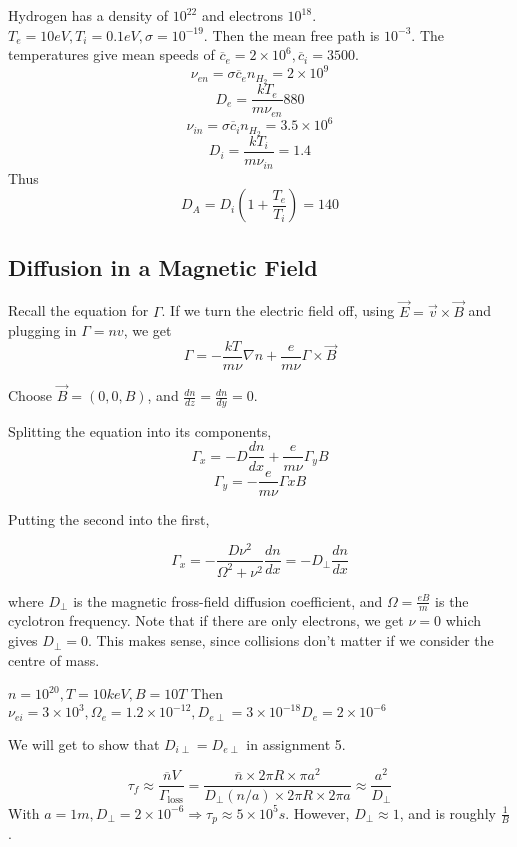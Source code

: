 \documentclass[12pt]{article}
\begin{document}
\begin{ex}
    Hydrogen has a density of $10^{22}$ and electrons $10^{18}$. $T_e = 10\unit{eV}, T_i = 0.1\unit{eV}, \sigma = 10^{-19}$. Then the mean free path is $10^{-3}$. The temperatures give mean speeds of $\overline c_e = 2 \times 10^6, \overline c_i = 3500$.
    $$\nu_{en} = \sigma\overline c_e n_{H_2} = 2 \times 10^9$$
    $$D_e = \frac{kT_e}{m\nu_{en}} 880$$
    $$\nu_{in} = \sigma \overline c_i n_{H_2} = 3.5 \times 10^6$$
    $$D_i = \frac{kT_i}{m\nu_{in}} = 1.4$$
    Thus
    $$D_A =  D_i\left(1 + \frac{T_e}{T_i}\right) = 140$$
\end{ex}

\subsection{Diffusion in a Magnetic Field}

Recall the equation for $\Gamma$. If we turn the electric field off, using $\vec E = \vec v \times \vec B$ and plugging in $\Gamma = nv$, we get
$$\Gamma = -\frac{kT}{m\nu} \nabla n + \frac{e}{m\nu} \Gamma \times \vec B$$

Choose $\vec B = (0,0,B)$, and $\frac{dn}{dz} = \frac{dn}{dy} = 0$.

Splitting the equation into its components,
$$\Gamma_x = -D \frac{dn}{dx} + \frac{e}{m\nu} \Gamma_yB$$
$$\Gamma_y = -\frac{e}{m\nu}\Gamma xB$$

Putting the second into the first,

$$\Gamma_x = -\frac{D\nu^2}{\Omega^2 + \nu^2} \frac{dn}{dx} = -D_\perp \frac{dn}{dx}$$

where $D_\perp$ is the magnetic fross-field diffusion coefficient, and $\Omega = \frac{eB}{m}$ is the cyclotron frequency. Note that if there are only electrons, we get $\nu = 0$ which gives $D_\perp = 0$. This makes sense, since collisions don't matter if we consider the centre of mass.

\begin{ex}
    $n = 10^{20}, T = 10\unit{keV}, B = 10\unit{T}$ Then
    $\nu_{ei} = 3 \times 10^3, \Omega_e = 1.2 \times 10^{-12}, D_{e\perp} = 3 \times 10^{-18}D_e = 2 \times 10^{-6}$
\end{ex}

We will get to show that $D_{i\perp} = D_{e\perp}$ in assignment 5.

\begin{ex}
    $$\tau_f \approx \frac{\overline nV}{\Gamma_{\text{loss}}} = \frac{\overline n \times 2\pi R \times \pi a^2}{D_\perp (n/a)\times 2\pi R \times 2\pi a} \approx \frac{a^2}{D_\perp}$$
    With $a = 1\unit{m}, D_\perp = 2\times 10^{-6} \Rightarrow \tau_p \approx 5 \times 10^5\unit{s}$. However, $D_\perp \approx 1$, and is roughly $\frac{1}{B}$.
\end{ex}
\end{document}
